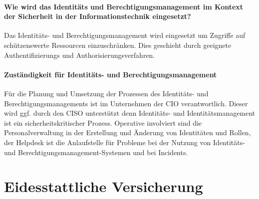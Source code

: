 \documentclass[12pt]{article}
\begin{document}
\paragraph{Wie wird das Identitäts und Berechtigungsmanagement im Kontext der Sicherheit in der Informationstechnik eingesetzt?}
Das Identitäts- und Berechtigungsmanagement wird eingesetzt um Zugriffe auf schützenswerte Ressourcen einzuschränken. Dies geschieht durch geeignete Authentifizierungs und Authorisierungsverfahren.
\paragraph{Zuständigkeit für Identitäts- und Berechtigungsmanagement}
Für die Planung und Umsetzung der Prozessen des Identitäts- und Berechtigungsmanagements ist im Unternehmen der CIO verantwortlich. Dieser wird ggf. durch den CISO unterstützt denn Identitäts- und Identitätsmanagement ist ein sicherheitskritischer Prozess. Operative involviert sind die Personalverwaltung in der Erstellung und Änderung von Identitäten und Rollen, der Helpdesk ist die Anlaufstelle für Probleme bei der Nutzung von Identitäts- und Berechtigungsmanagement-Systemen und bei Incidents.
\newpage
\section{Eidesstattliche Versicherung}
\newpage
\printbibliography[notkeyword={quelle}, title={Literaturverzeichnis}]
\newpage
\printbibliography[keyword={quelle}, title={Quellenverzeichnis}]
\newpage
\listoffigures
\end{document}

